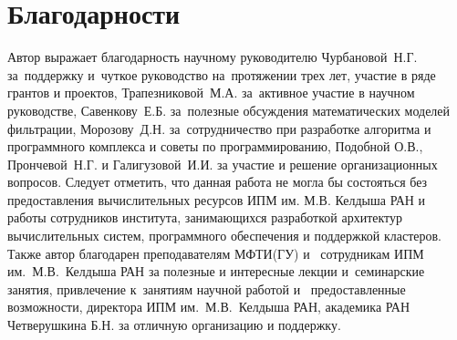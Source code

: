 \section*{Благодарности}

Автор выражает благодарность научному руководителю Чурбановой~Н.Г.
за~поддержку и~чуткое руководство на~протяжении трех лет,
участие в ряде грантов и проектов,
Трапезниковой~М.А. за~активное участие в научном руководстве,
Савенкову~Е.Б. за~полезные обсуждения математических моделей
фильтрации, Морозову~Д.Н. за~сотрудничество при разработке алгоритма
и программного комплекса и советы по программированию, Подобной О.В.,
Прончевой~Н.Г. и Галигузовой~И.И. за участие и решение организационных вопросов.
Следует отметить, что данная работа не могла бы состояться без предоставления
вычислительных ресурсов ИПМ им. М.В. Келдыша РАН и работы сотрудников
института, занимающихся разработкой архитектур вычислительных
систем, программного обеспечения и поддержкой кластеров.
Также автор благодарен преподавателям МФТИ(ГУ) и~
сотрудникам ИПМ им.~М.В.~Келдыша РАН за полезные и интересные лекции
и~семинарские занятия, привлечение к~занятиям научной работой и~
предоставленные возможности, директора ИПМ им.~М.В.~Келдыша РАН, академика РАН
Четверушкина Б.Н. за отличную организацию и поддержку.
